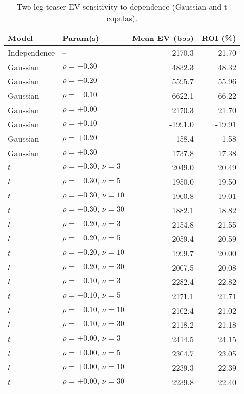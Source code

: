 \begin{table}[t]
  \centering
  \small
  \caption{Two-leg teaser EV sensitivity to dependence (Gaussian and t copulas).}
  \begin{tabular}{l l r r}
    \toprule
 \textbf{Model} & \textbf{Param(s)} & \textbf{Mean EV (bps)} & \textbf{ROI (\%)} \\
    \midrule
    Independence & -- & 2170.3 & 21.70 \\
    \midrule
    Gaussian & $\rho=-0.30$ & 4832.3 & 48.32 \\
    Gaussian & $\rho=-0.20$ & 5595.7 & 55.96 \\
    Gaussian & $\rho=-0.10$ & 6622.1 & 66.22 \\
    Gaussian & $\rho=+0.00$ & 2170.3 & 21.70 \\
    Gaussian & $\rho=+0.10$ & -1991.0 & -19.91 \\
    Gaussian & $\rho=+0.20$ & -158.4 & -1.58 \\
    Gaussian & $\rho=+0.30$ & 1737.8 & 17.38 \\
    \midrule
    $t$ & $\rho=-0.30,\,\nu=3$ & 2049.0 & 20.49 \\
    $t$ & $\rho=-0.30,\,\nu=5$ & 1950.0 & 19.50 \\
    $t$ & $\rho=-0.30,\,\nu=10$ & 1900.8 & 19.01 \\
    $t$ & $\rho=-0.30,\,\nu=30$ & 1882.1 & 18.82 \\
    $t$ & $\rho=-0.20,\,\nu=3$ & 2154.8 & 21.55 \\
    $t$ & $\rho=-0.20,\,\nu=5$ & 2059.4 & 20.59 \\
    $t$ & $\rho=-0.20,\,\nu=10$ & 1999.7 & 20.00 \\
    $t$ & $\rho=-0.20,\,\nu=30$ & 2007.5 & 20.08 \\
    $t$ & $\rho=-0.10,\,\nu=3$ & 2282.4 & 22.82 \\
    $t$ & $\rho=-0.10,\,\nu=5$ & 2171.1 & 21.71 \\
    $t$ & $\rho=-0.10,\,\nu=10$ & 2102.4 & 21.02 \\
    $t$ & $\rho=-0.10,\,\nu=30$ & 2118.2 & 21.18 \\
    $t$ & $\rho=+0.00,\,\nu=3$ & 2414.5 & 24.15 \\
    $t$ & $\rho=+0.00,\,\nu=5$ & 2304.7 & 23.05 \\
    $t$ & $\rho=+0.00,\,\nu=10$ & 2239.3 & 22.39 \\
    $t$ & $\rho=+0.00,\,\nu=30$ & 2239.8 & 22.40 \\

\end{tabular}
\end{table}
